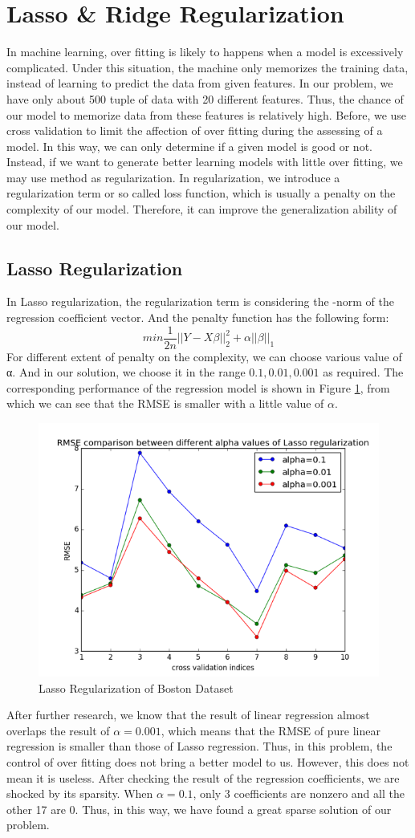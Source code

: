 \documentclass{article}
\begin{document}
\section{Lasso \& Ridge Regularization}
In machine learning, over fitting is likely to happens when a model is excessively complicated. Under this situation, the machine only memorizes the training data, instead of learning to predict the data from given features. In our problem, we have only about 500 tuple of data with 20 different features. Thus, the chance of our model to memorize data from these features is relatively high.
Before, we use cross validation to limit the affection of over fitting during the assessing of a model. In this way, we can only determine if a given model is good or not. Instead, if we want to generate better learning models with little over fitting, we may use method as regularization.
In regularization, we introduce a regularization term or so called loss function, which is usually a penalty on the complexity of our model. Therefore, it can improve the generalization ability of our model.
\subsection{Lasso Regularization}
In Lasso regularization, the regularization term is considering the -norm of the regression coefficient vector. And the penalty function has the following form:
\begin{equation*}
min\frac{1}{2n}||Y-X\beta||^2_2+\alpha||\beta||_1
\end{equation*}
For different extent of penalty on the complexity, we can choose various value of α. And in our solution, we choose it in the range ${0.1,0.01,0.001}$ as required. The corresponding performance of the regression model is shown in Figure \ref{fig:lar}, from which we can see that the RMSE is smaller with a little value of $\alpha$. 
\begin{figure}[htbp]
\centering
\includegraphics[width=.6\textwidth]{lar.png}
\caption{Lasso Regularization of Boston Dataset}
\label{fig:lar}
\end{figure}
After further research, we know that the result of linear regression almost overlaps the result of $\alpha=0.001$, which means that the RMSE of pure linear regression is smaller than those of Lasso regression. Thus, in this problem, the control of over fitting does not bring a better model to us. However, this does not mean it is useless. After checking the result of the regression coefficients, we are shocked by its sparsity. When $\alpha=0.1$, only 3 coefficients are nonzero and all the other 17 are 0. Thus, in this way, we have found a great sparse solution of our problem.
\end{document}
